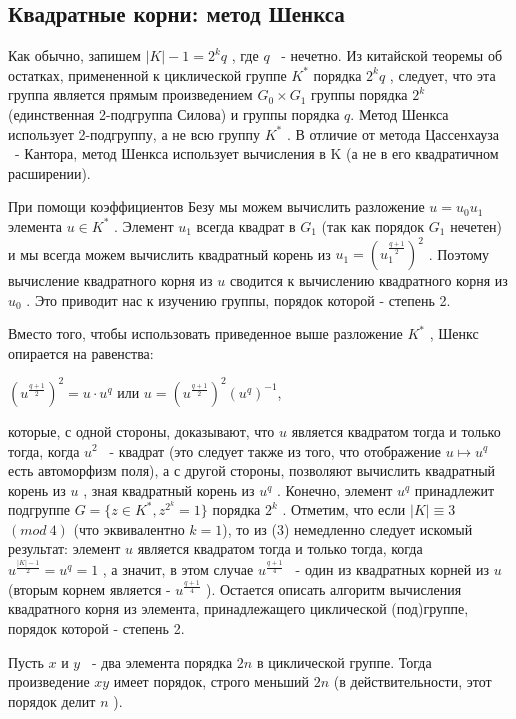 \newpage


\subsection{Квадратные корни: метод Шенкса}


Как обычно, запишем $|K|-1=2^kq$
, где $q$
 ~- нечетно. Из китайской теоремы об остатках, примененной к циклической группе $K^*$
 порядка $2^kq$
 , следует, что эта группа является прямым произведением $G_0\times G_1$
 группы порядка $2^k$
 (единственная 2-подгруппа Силова) и группы порядка $q$. Метод Шенкса использует 2-подгруппу, а не всю группу $K^*$
 . В отличие от метода Цассенхауза ~- Кантора, метод Шенкса использует вычисления в K (а не в его квадратичном расширении).

При помощи коэффициентов Безу мы можем вычислить разложение $u=u_0u_1$
 элемента $u\in K^*$
 . Элемент $u_1$
 всегда квадрат в $G_1$
 (так как порядок $G_1$
 нечетен) и мы всегда можем вычислить квадратный корень из $u_1=(u_1^{\frac{q+1}{2}})^2$
 . Поэтому вычисление квадратного корня из $u$
 сводится к вычислению квадратного корня из $u_0$
 . Это приводит нас к изучению группы, порядок которой - степень 2.

Вместо того, чтобы использовать приведенное выше разложение $K^*$
, Шенкс опирается на равенства:

\begin{center}
$(u^{\frac{q+1}{2}})^2 = u\cdot u^q$ или $u=(u^{\frac{q+1}{2}})^2(u^q)^{-1}$,
\end{center}


которые, с одной стороны, доказывают, что $u$
 является квадратом тогда и только тогда, когда $u^2$
 ~- квадрат (это следует также из того, что отображение $u\mapsto u^q$
 есть автоморфизм поля), а с другой стороны, позволяют вычислить квадратный корень из $u$
 , зная квадратный корень из $u^q$
. Конечно, элемент $u^q$
 принадлежит подгруппе $G=\{z\in K^*, z^{2^k}=1\}$
 порядка $2^k$
 . Отметим, что если $|K|\equiv 3$ $(mod \ 4)$
 (что эквивалентно $k = 1$), то из (3) немедленно следует искомый результат: элемент $u$
 является квадратом тогда и только тогда, когда $u^{\frac{|K|-1}{2}}=u^q=1$
 , а значит, в этом случае $u^{\frac{q+1}{4}}$
 ~- один из квадратных корней из $u$
 (вторым корнем является - $u^{\frac{q+1}{4}}$
    ). Остается описать алгоритм вычисления квадратного корня из элемента, принадлежащего циклической (под)группе, порядок которой - степень 2.

\begin{lemma}
Пусть $x$
 и $y$
 ~- два элемента порядка $2n$
 в циклической группе. Тогда произведение $xy$
 имеет порядок, строго меньший $2n$
 (в действительности, этот порядок делит $n$
    ).
\end{lemma}

